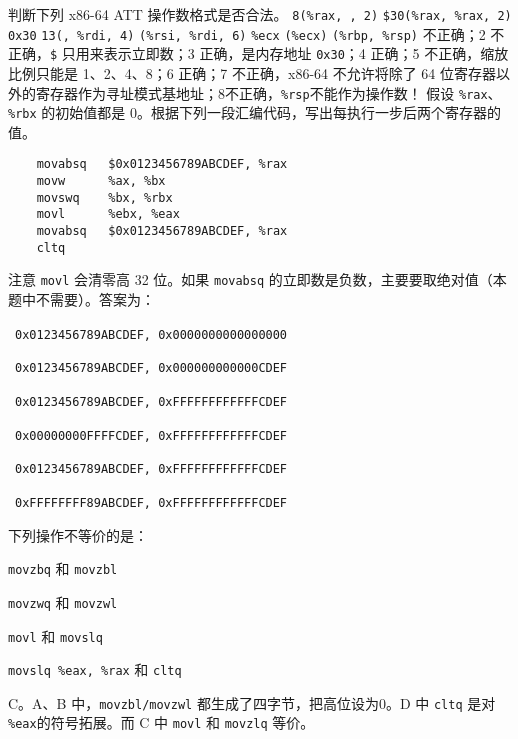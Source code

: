     \begin{problems}
        \pro 判断下列 x86-64 ATT 操作数格式是否合法。
            \qn \verb|8(%rax, , 2)|
            \qn \verb|$30(%rax, %rax, 2)|
            \qn \verb|0x30|
            \qn \verb|13(, %rdi, 4)|
            \qn \verb|(%rsi, %rdi, 6)|
            \qn \verb|%ecx|
            \qn \verb|(%ecx)|
            \qn \verb|(%rbp, %rsp)|
         不正确；2 不正确，\verb|$| 只用来表示立即数；3 正确，是内存地址 \verb|0x30|；4 正确；5 不正确，缩放比例只能是 1、2、4、8；6 正确；7 不正确，x86-64 不允许将除了 64 位寄存器以外的寄存器作为寻址模式基地址；8不正确，\verb|%rsp|不能作为操作数！
        \pro 假设 \verb|%rax|、\verb|%rbx| 的初始值都是 0。根据下列一段汇编代码，写出每执行一步后两个寄存器的值。
        \begin{verbatim}
    movabsq   $0x0123456789ABCDEF, %rax
    movw      %ax, %bx
    movswq    %bx, %rbx
    movl      %ebx, %eax
    movabsq   $0x0123456789ABCDEF, %rax
    cltq
        \end{verbatim}
        \sol 注意 \verb|movl| 会清零高 32 位。如果 \verb|movabsq| 的立即数是负数，主要要取绝对值（本题中不需要）。答案为：
        \begin{compactenum}
            \item \ \verb|0x0123456789ABCDEF, 0x0000000000000000|
            \item \ \verb|0x0123456789ABCDEF, 0x000000000000CDEF|
            \item \ \verb|0x0123456789ABCDEF, 0xFFFFFFFFFFFFCDEF|
            \item \ \verb|0x00000000FFFFCDEF, 0xFFFFFFFFFFFFCDEF|
            \item \ \verb|0x0123456789ABCDEF, 0xFFFFFFFFFFFFCDEF|
            \item \ \verb|0xFFFFFFFF89ABCDEF, 0xFFFFFFFFFFFFCDEF|
        \end{compactenum}
        \pro 下列操作不等价的是：
        \begin{choices}
            \item \verb|movzbq| 和 \verb|movzbl|
            \item \verb|movzwq| 和 \verb|movzwl|
            \item \verb|movl| 和 \verb|movslq|
            \item \verb|movslq %eax, %rax| 和 \verb|cltq|
        \end{choices}
        \sol C。A、B 中，\verb|movzbl/movzwl| 都生成了四字节，把高位设为0。D 中 \verb|cltq| 是对 \verb|%eax|的符号拓展。而 C 中 \verb|movl| 和 \verb|movzlq| 等价。

\end{problems}
